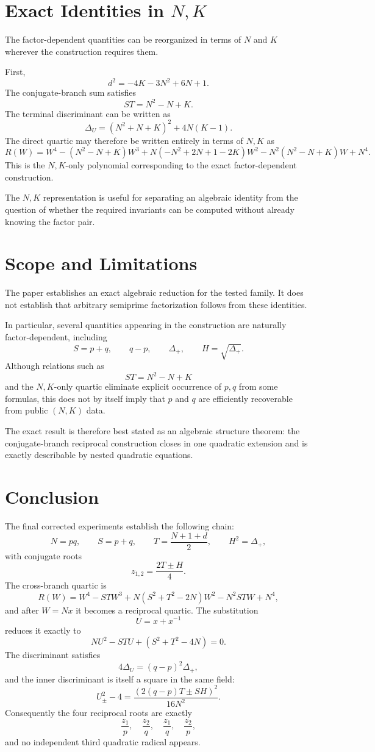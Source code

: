 \documentclass[11pt,a4paper]{article}
\theoremstyle{definition}
\theoremstyle{remark}
\begin{document}
\section{Exact Identities in \texorpdfstring{$N,K$}{N,K}}

The factor-dependent quantities can be reorganized in terms of $N$ and $K$ wherever the construction requires them.

First,
\[
 d^2=-4K-3N^2+6N+1.
\]
The conjugate-branch sum satisfies
\[
ST=N^2-N+K.
\]
The terminal discriminant can be written as
\[
\Delta_U=(N^2+N+K)^2+4N(K-1).
\]
The direct quartic may therefore be written entirely in terms of $N,K$ as
\[
R(W)
=W^4-(N^2-N+K)W^3
+N(-N^2+2N+1-2K)W^2
-N^2(N^2-N+K)W+N^4.
\]
This is the $N,K$-only polynomial corresponding to the exact factor-dependent construction.

The $N,K$ representation is useful for separating an algebraic identity from the question of whether the required invariants can be computed without already knowing the factor pair.

\section{Scope and Limitations}

The paper establishes an exact algebraic reduction for the tested family. It does not establish that arbitrary semiprime factorization follows from these identities.

In particular, several quantities appearing in the construction are naturally factor-dependent, including
\[
S=p+q,
\qquad
q-p,
\qquad
\Delta_+,
\qquad
H=\sqrt{\Delta_+}.
\]
Although relations such as
\[
ST=N^2-N+K
\]
and the $N,K$-only quartic eliminate explicit occurrence of $p,q$ from some formulas, this does not by itself imply that $p$ and $q$ are efficiently recoverable from public $(N,K)$ data.

The exact result is therefore best stated as an algebraic structure theorem: the conjugate-branch reciprocal construction closes in one quadratic extension and is exactly describable by nested quadratic equations.

\section{Conclusion}

The final corrected experiments establish the following chain:
\[
N=pq,
\qquad
S=p+q,
\qquad
T=\frac{N+1+d}{2},
\qquad
H^2=\Delta_+,
\]
with conjugate roots
\[
z_{1,2}=\frac{2T\pm H}{4}.
\]
The cross-branch quartic is
\[
R(W)=W^4-STW^3+N(S^2+T^2-2N)W^2-N^2STW+N^4,
\]
and after $W=Nx$ it becomes a reciprocal quartic. The substitution
\[
U=x+x^{-1}
\]
reduces it exactly to
\[
NU^2-STU+(S^2+T^2-4N)=0.
\]
The discriminant satisfies
\[
4\Delta_U=(q-p)^2\Delta_+,
\]
and the inner discriminant is itself a square in the same field:
\[
U_\pm^2-4
=\frac{(2(q-p)T\pm SH)^2}{16N^2}.
\]
Consequently the four reciprocal roots are exactly
\[
\frac{z_1}{p},\quad
\frac{z_2}{q},\quad
\frac{z_1}{q},\quad
\frac{z_2}{p},
\]
and no independent third quadratic radical appears.
\end{document}
